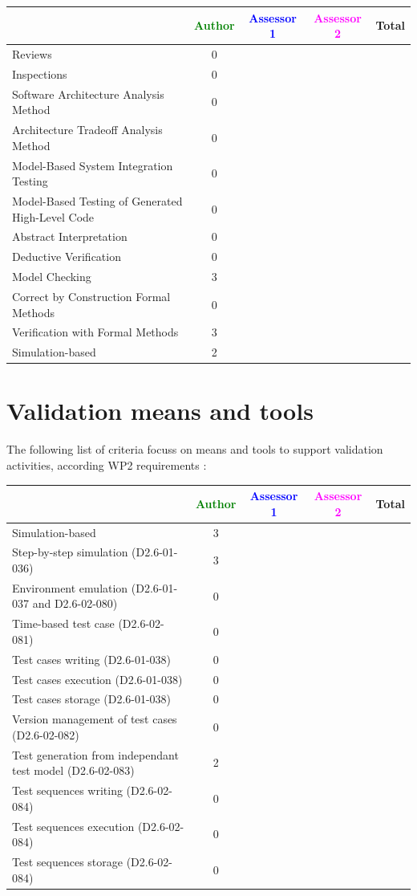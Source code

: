 \begin{tabular}{|l | c | c | c | c|}
\hline
& \textcolor{green}{Author} & \textcolor{blue}{Assessor 1} & \textcolor{magenta}{Assessor 2} & Total \\
\hline 
Reviews & 0& & &  \\
\hline
Inspections & 0& & &  \\
\hline
Software Architecture Analysis Method & 0& & &  \\
\hline
Architecture Tradeoff Analysis Method & 0& & &  \\
\hline
Model-Based System Integration Testing & 0& & &  \\
\hline
Model-Based Testing of Generated High-Level Code & 0& & &  \\
\hline
Abstract Interpretation & 0& & &  \\
\hline
Deductive Verification & 0& & &  \\
\hline
Model Checking & 3& & &  \\
\hline
Correct by Construction Formal Methods & 0& & &  \\
\hline
Verification with Formal Methods & 3& & &  \\
\hline
Simulation-based & 2& & &  \\
\hline
\end{tabular}

\section{Validation means and tools}

The following list of criteria focuss on means and tools to support validation activities, according WP2  requirements :

\begin{tabular}{|l | c | c | c | c|}
\hline
& \textcolor{green}{Author} & \textcolor{blue}{Assessor 1} & \textcolor{magenta}{Assessor 2} & Total \\
\hline 
Simulation-based & 3& & &  \\
\hline
Step-by-step simulation (D2.6-01-036) & 3& & &  \\
\hline
Environment emulation (D2.6-01-037 and D2.6-02-080) & 0& & &  \\
\hline
Time-based test case (D2.6-02-081) & 0& & &  \\
\hline
Test cases writing (D2.6-01-038) & 0& & &  \\
\hline
Test cases execution (D2.6-01-038) & 0& & &  \\
\hline
Test cases storage (D2.6-01-038) & 0& & &  \\
\hline
Version management of test cases (D2.6-02-082) & 0& & &  \\
\hline
Test generation from independant test model (D2.6-02-083) & 2& & &  \\
\hline
Test sequences writing (D2.6-02-084) & 0& & &  \\
\hline
Test sequences execution (D2.6-02-084) & 0& & &  \\
\hline
Test sequences storage (D2.6-02-084) & 0& & &  \\
\hline
\end{tabular}

